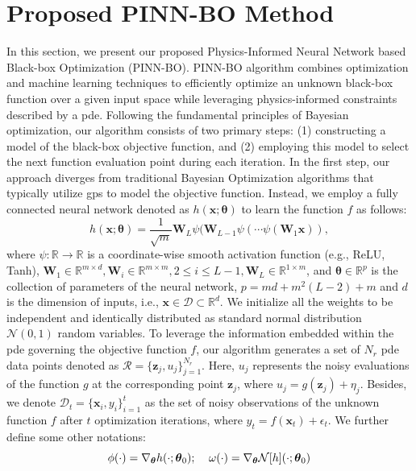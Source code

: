 \section{Proposed PINN-BO Method}
In this section, we present our proposed Physics-Informed Neural Network based Black-box Optimization (PINN-BO). PINN-BO algorithm combines optimization and machine learning techniques to efficiently optimize an unknown black-box function over a given input space while leveraging physics-informed constraints described by a \ac{pde}. Following the fundamental principles of Bayesian optimization, our algorithm consists of two primary steps: (1) constructing a model of the black-box objective function, and (2) employing this model to select the next function evaluation point during each iteration. In the first step, our approach diverges from traditional Bayesian Optimization algorithms that typically utilize \acfp{gp} to model the objective function. Instead, we employ a fully connected neural network denoted as $h(\mathbf{x}; \boldsymbol{\theta})$ to learn the function $f$ as follows:
\[
h(\mathbf{x};\boldsymbol{\theta}) = \frac{1}{\sqrt{m}} \mathbf{W}_L \psi(\mathbf{W}_{L-1}\psi(\cdots \psi(\mathbf{W}_1 \mathbf{x})),
\]
where $\psi\colon \mathbb{R} \rightarrow \mathbb{R}$ is a coordinate-wise smooth activation function (e.g., ReLU, Tanh), $\mathbf{W}_1 \in \mathbb{R}^{m \times d}, \mathbf{W}_i \in \mathbb{R}^{m \times m}, 2\leq i \leq L-1, \mathbf{W}_L \in \mathbb{R}^{1 \times m}$, and $\boldsymbol{\theta} \in \mathbb{R}^p$ is the collection of parameters of the neural network, $p=md+m^2(L-2)+m$ and $d$ is the dimension of inputs, i.e., $\mathbf{x} \in \mathcal{D} \subset \mathbb{R}^d$. We initialize all the weights to be independent and identically distributed as standard normal distribution $\mathcal{N}(0,1)$ random variables. To leverage the information embedded within the \ac{pde} governing the objective function $f$, our algorithm generates a set of $N_r$ \ac{pde} data points denoted as $\mathcal{R} =  \{\mathbf{z}_j, u_j\}_{j=1}^{N_r}$. Here, $u_j$ represents the noisy evaluations of the function $g$ at the corresponding point $\mathbf{z}_j$, where $u_j = g(\mathbf{z}_j) + \eta_j$. Besides, we denote $\mathcal{D}_t = \{\mathbf{x}_i, y_i\}_{i=1}^t$ as the set of noisy observations of the unknown function $f$ after $t$ optimization iterations, where $y_t = f(\mathbf{x}_t) + \epsilon_t$. We further define some other notations:
\begin{equation*}
        \phi(\cdot) = \nabla_{\boldsymbol{\theta}} h(\cdot; \boldsymbol{\theta}_0) ; \; \; \; \;
        \omega(\cdot)  = \nabla_{\boldsymbol{\theta}} \mathcal{N}[h] (\cdot; \boldsymbol{\theta}_0)\\
\end{equation*}
